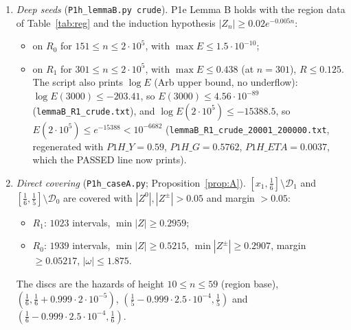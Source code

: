 \documentclass[11pt]{article}
\theoremstyle{remark}\newtheorem{remark}[theorem]{Remark}
\begin{document}
\begin{proposition}
\begin{enumerate}
 \begin{itemize}
 \item $R_0$: all 227 seeds with $10\le n\le150$ and radius $\varepsilon_n(y_0)$ satisfy $E\le0.00214$;
 \item $R_1$: all 654 seeds with $10\le n\le300$ and radius $\varepsilon_n(y_1)$ satisfy $E\le0.0136$ (the maximum is at $2/13$);
 \end{itemize}
 $R\le\frac12$ throughout, and all side conditions pass.
\item \emph{Deep seeds} (\texttt{P1h\_lemmaB.py crude}). P1e Lemma B holds with the region data of Table~\ref{tab:reg} and the induction hypothesis $|Z_n|\ge0.02e^{-0.005n}$:
 \begin{itemize}
 \item on $R_0$ for $151\le n\le2\cdot10^5$, with $\max E\le1.5\cdot10^{-10}$;
 \item on $R_1$ for $301\le n\le2\cdot10^5$, with $\max E\le0.438$ (at $n=301$), $R\le0.125$. The script also prints $\log E$ (Arb upper bound, no underflow): $\log E(3000)\le-203.41$, so $E(3000)\le4.56\cdot10^{-89}$ (\texttt{lemmaB\_R1\_crude.txt}), and $\log E(2\cdot10^5)\le-15388.5$, so $E(2\cdot10^5)\le e^{-15388}<10^{-6682}$ (\texttt{lemmaB\_R1\_crude\_20001\_200000.txt}, regenerated with $P1H\_Y=0.59$, $P1H\_G=0.5762$, $P1H\_ETA=0.0037$, which the PASSED line now prints).
 \end{itemize}
\item \emph{Direct covering} (\texttt{P1h\_caseA.py}; Proposition~\ref{prop:A}). $[x_1,\frac16]\setminus\mathcal D_1$ and $[\frac16,\frac15]\setminus\mathcal D_0$ are covered with $|Z^0|,|Z^\pm|>0.05$ and margin $>0.05$:
 \begin{itemize}
 \item $R_1$: $1023$ intervals, $\min|Z|\ge0.2959$;
 \item $R_0$: $1939$ intervals, $\min|Z|\ge0.5215$, $\min|Z^\pm|\ge0.2907$, margin $\ge0.05217$, $|\omega|\le1.875$.
 \end{itemize}
 The discs are the hazards of height $10\le n\le59$ (region base), $(\frac16,\frac16+0.999\cdot2\cdot10^{-5})$, $(\frac15-0.999\cdot2.5\cdot10^{-4},\frac15)$ and $(\frac16-0.999\cdot2.5\cdot10^{-4},\frac16)$.
\end{enumerate}
\end{proposition}
\end{document}
